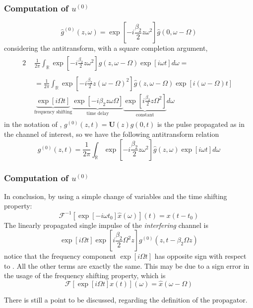 \documentclass[8pt]{beamer} %
\begin{document}
\begin{frame}
\frametitle{Computation of $u^{(0)}$}
\begin{equation}
	\hat{g}^{(0)}(z, \omega) =  \exp \left[- i \frac{\beta_{2}}{2} z \omega^2 \right] \hat{g}(0, \omega - \Omega)
\end{equation}
considering the antitransform, with a square completion argument,
 \begin{alignat}{2}
    &\begin{aligned}
        \frac{1}{2\pi} \int_{\mathbb{R}} \exp \left[-i\frac{\beta_2}{2}z \omega^2 \right] \hat{g}(z, \omega - \Omega) \exp \left[i\omega t\right] d\omega =
    \end{aligned}\label{eq:nlA} \\
    &\begin{aligned}
       =\frac{1}{2\pi} \int_{\mathbb{R}} \exp \left[-i\frac{\beta_2}{2}z (\omega-\Omega)^2 \right]  \hat{g}(z, \omega - \Omega) \exp \left[i(\omega -\Omega) t\right] \\
   \underbrace{\exp \left[i\Omega t\right]}_{\text{frequency shifting}} \underbrace{\exp \left[- i \beta_2 z \omega \Omega\right]}_{\text{time delay}} \underbrace{\exp\left[i\frac{\beta_2}{2}z \Omega^2 \right]}_{\text{constant}} d\omega
    \end{aligned}\label{eq:nlB}
\end{alignat}
in the notation of \cite{Dar_2013}, $g^{(0)}(z, t) = \mathbf{U}(z)g(0, t)$ is the pulse propagated as in the channel of interest, so we have the following antitransform relation
\begin{equation}
	g^{(0)}(z, t) = \frac{1}{2\pi}\int_{\mathbb{R}} \exp \left[-i\frac{\beta_2}{2}z \omega^2 \right]  \hat{g}(z, \omega) \exp\left[i\omega t\right]d\omega
\end{equation}
\end{frame}

\begin{frame}
	\frametitle{Computation of $u^{(0)}$}
	In conclusion, by using a simple change of variables and the time shifting property:
	\begin{equation}
		\mathcal{F}^{-1}\left[\exp[-i\omega t_0] \hat{x}(\omega)\right](t) = x(t-t_0)
	\end{equation}
	The linearly propagated single impulse of the \textit{interfering} channel is
	\begin{equation}
		\exp \left[i\Omega t\right] \exp \left[i \frac{\beta_2}{2}\Omega^2 z \right] g^{(0)}(z, t - \beta_2\Omega z)
	\end{equation}
	notice that the frequency component $\exp[i \Omega t]$ has opposite sign with respect to \cite{Dar_2013}. All the other terms are exactly the same.
	This may be due to a sign error in the usage of the frequency shifting property, which is
	\begin{equation}
		\mathcal{F}\left[\exp[i \Omega t] x(t)\right](\omega) = \hat{x}(\omega - \Omega)
	\end{equation}

	\vspace{20pt}
	There is still a point to be discussed, regarding the definition of the propagator.
\end{frame}
\end{document}
